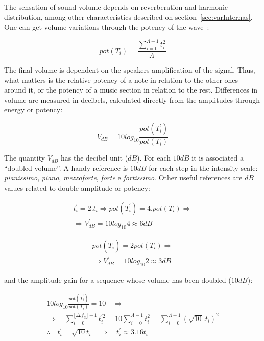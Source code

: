 \documentclass[
 aip,
 jmp,
 amsmath,amssymb,
 reprint,
]{revtex4-1}
\begin{document}
The sensation of sound volume depends on reverberation and harmonic distribution, among other characteristics described on section~\ref{sec:varInternas}. One can get volume variations through the potency of the wave~\cite{Chowning}:

\begin{equation}\label{eq:potencia}
pot(T_i)=\frac{\sum_{i=0}^{\Lambda -1} t_i^2}{\Lambda}
\end{equation} 

The final volume is dependent on the speakers amplification of the signal. Thus, what matters is the relative potency of a note in relation to the other ones around it, or the potency of a music section in relation to the rest. Differences in volume are measured in decibels, calculated directly from the amplitudes through energy or potency:

\begin{equation}\label{decibels}
V_{dB}=10log_{10}\frac{pot(T^{'}_i)}{pot(T_i)}
\end{equation}

The quantity $V_{dB}$ has the decibel unit ($dB$). 
For each $10dB$ it is associated a ``doubled volume''.
A handy reference is $10dB$ for each step in the intensity scale: \emph{pianissimo}, \emph{piano}, \emph{mezzoforte}, \emph{forte} e \emph{fortissimo}. Other useful references are $dB$ values related to double amplitude or potency:

\begin{equation}\label{eq:ampVol}
\begin{split}
t_i^{'}=2 . t_i \Rightarrow pot(T^{'}_i)=4 . pot(T_i) \Rightarrow \\ \Rightarrow V^{'}_{dB}=10log_{10} 4 \approx 6 dB
\end{split}
\end{equation}

\begin{equation}\label{eq:potVol}
\begin{split}
pot(T^{'}_i)=2 pot(T_i) \Rightarrow \\ \Rightarrow V^{'}_{dB}=10log_{10} 2 \approx 3 dB
\end{split}
\end{equation}

and the amplitude gain for a sequence whose volume has been doubled ($10dB$):

\begin{equation}\label{eq:dobraVol}
\begin{split}
10log_{10}\frac{pot(T^{'}_i)}{pot(T_i)} = 10 \quad \Rightarrow \\ \Rightarrow \quad \sum_{i=0}^{\lfloor \Delta.f_a \rfloor -1}t^{'2}_i=10\sum_{i=0}^{\Lambda-1}t_i^2=\sum_{i=0}^{\Lambda-1}(\sqrt{10}.t_i)^2 \\
\therefore \quad t^{'}_i=\sqrt{10}t_i \quad \Rightarrow \quad t^{'}_i \approx 3.16t_i
\end{split}
\end{equation}
\end{document}
